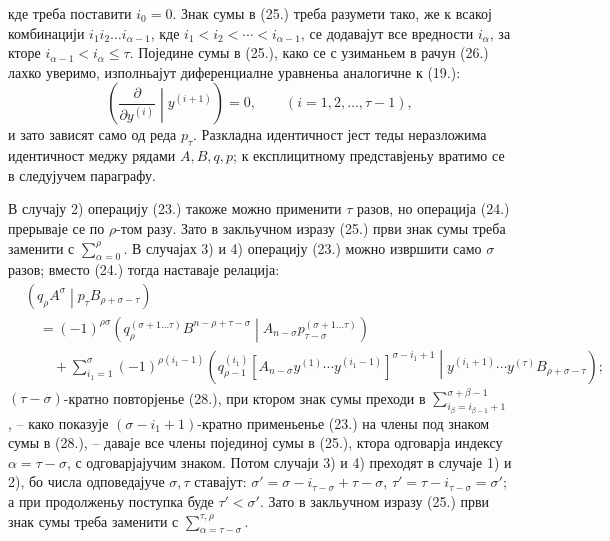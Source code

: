 ﻿\documentclass[11pt]{article}
\newcommand{\pair}[2]{\left(#1\middle|#2\right)}
\begin{document}
кде треба поставити $i_0=0$. Знак сумы в (25.) треба разумети тако, же к всакој комбинацији $i_1i_2\ldots i_{\alpha-1}$, кде $i_1<i_2<\cdots<i_{\alpha-1}$, се додавајут все вредности $i_\alpha$, за кторе $i_{\alpha-1}<i_\alpha\le\tau$. Поједине сумы в (25.), како се с узиманьем в рачун (26.) лахко уверимо, изполньајут диференциалне уравненьа аналогичне к (19.):
\begin{equation}
 \left(\frac{\partial}{\partial y^{(i)}}\middle|y^{(i+1)}\right)=0,
 \qquad (i=1,2,\ldots,\tau-1),
\tag{27}
\end{equation}
и зато зависят само од реда $p_\tau$. Разкладна идентичност јест теды неразложима идентичност меджу рядами $A,B,q,p$; к експлицитному представјеньу вратимо се в следујучем параграфу.

В случају 2) операцију (23.) такоже можно применити $\tau$ разов, но операција (24.) прерываје се по $\rho$-том разу. Зато в закльучном изразу (25.) први знак сумы треба заменити с $\sum_{\alpha=0}^{\rho}$. В случајах 3) и 4) операцију (23.) можно извршити само $\sigma$ разов; вместо (24.) тогда наставаје релација:
\begin{equation}
\begin{aligned}
&\pair{q_\rho A^\sigma}{p_\tau B_{\rho+\sigma-\tau}}\\
&\quad=(-1)^{\rho\sigma}
\pair{q_\rho^{(\sigma+1\ldots\tau)}B^{n-\rho+\tau-\sigma}}
{A_{n-\sigma}p_{\tau-\sigma}^{(\sigma+1\ldots\tau)}}\\
&\qquad+\sum_{i_1=1}^{\sigma}(-1)^{\rho(i_1-1)}
\pair{q_{\rho-1}^{(i_1)}
[A_{n-\sigma}y^{(1)}\cdots y^{(i_1-1)}]^{\sigma-i_1+1}}
{y^{(i_1+1)}\cdots y^{(\tau)}B_{\rho+\sigma-\tau}};
\end{aligned}
\tag{28}
\end{equation}
$(\tau-\sigma)$-кратно повторјенье (28.), при ктором знак сумы преходи в $\sum_{i_\beta=i_{\beta-1}+1}^{\sigma+\beta-1}$, -- како показује $(\sigma-i_1+1)$-кратно применьенье (23.) на члены под знаком сумы в (28.), -- даваје все члены појединој сумы в (25.), ктора одговарја индексу $\alpha=\tau-\sigma$, с одговарјајучим знаком. Потом случаји 3) и 4) преходят в случаје 1) и 2), бо числа одповедајуче $\sigma,\tau$ ставајут: $\sigma'=\sigma-i_{\tau-\sigma}+\tau-\sigma$, $\tau'=\tau-i_{\tau-\sigma}=\sigma'$; а при продолженьу поступка буде $\tau'<\sigma'$. Зато в закльучном изразу (25.) први знак сумы треба заменити с $\sum_{\alpha=\tau-\sigma}^{\tau,\rho}$.
\end{document}

